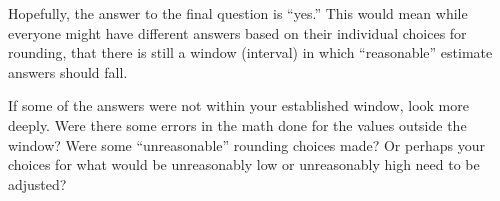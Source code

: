 \documentclass[12pt]{ximera}
\begin{document}
Hopefully, the answer to the final question is ``yes.'' This would mean while everyone
might have different answers based on their individual choices for rounding, that there
is still a window (interval) in which ``reasonable'' estimate answers should fall.

If some of the answers were not within your established window, look more deeply. Were
there some errors in the math done for the values outside the window? Were some
``unreasonable'' rounding choices made? Or perhaps your choices for what would be
unreasonably low or unreasonably high need to be adjusted?
\end{document}
